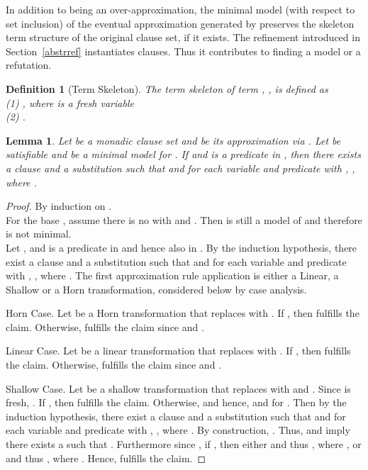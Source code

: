 \documentclass{llncs}
\newtheorem{defin}{Definition}
\newtheorem{lem}[theorem]{Lemma}
\begin{document}
In addition to being an over-approximation, the minimal model (with respect to set inclusion)
 of the eventual approximation
generated by   preserves the skeleton term structure
of the original clause set, if it exists. The refinement introduced in Section~\ref{abstrref}
instantiates clauses. Thus it contributes to finding a model or a refutation.

\begin{defin}[Term Skeleton]\label{termSkel}
The term skeleton of term  , , is defined as \\
(1) , where  is a fresh variable \\
(2) . 
\end{defin}


\begin{lem}\label{termSkelLem2}
Let  be a monadic clause set and  be its approximation via  . 
Let  be satisfiable and  be a minimal model for .
If   and  is a predicate in , then there exists a clause 
 and a substitution  such that
 and for each variable  and predicate  with , , where .
\end{lem}

\begin{proof}
By induction on .\\
For the base , assume there is no  with  and .
Then  is still a model of  and therefore  is not minimal.\\
Let  ,  and  is a predicate in  and hence also in . 
By the induction hypothesis, there exist a clause  and a substitution  such that
 and for each variable  and predicate  with , , where .
The first approximation rule application is either a Linear, a Shallow or a Horn transformation,
considered below by case analysis.

Horn Case. Let  be a Horn transformation that replaces  with .
If , then  fulfills the claim.
Otherwise,  fulfills the claim since  and .

Linear Case. Let  be a linear transformation that replaces  with .
If , then  fulfills the claim.
Otherwise,  fulfills the claim since  and .

Shallow Case. Let  be a shallow transformation that replaces  with  and .
Since  is fresh, .
If , then  fulfills the claim.
Otherwise,  and hence,  and  for .
Then by the induction hypothesis, there exist a clause  and a substitution  such that
 and for each variable  and predicate  with , , where .
By construction, . 
Thus,   and  imply there exists a  such that .
Furthermore since , if , then 
either  and thus  , where , or 
 and thus  , where .
Hence,   fulfills the claim.
\end{proof}
\end{document}
